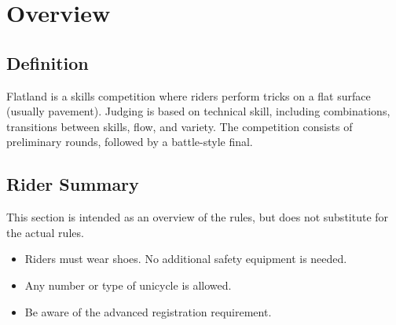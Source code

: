\chapter{Overview}

\section{Definition}

Flatland is a skills competition where riders perform 
tricks on a flat surface (usually pavement).
Judging is based on technical skill, including combinations, transitions between skills, flow, and variety.
The competition consists of preliminary rounds, followed by a battle-style final.

\section{Rider Summary}

This section is intended as an overview of the rules, but does not
substitute for the actual rules.
\begin{itemize}
\item Riders must wear shoes. No additional safety equipment is needed.
\item Any number or type of unicycle is allowed.
\item Be aware of the advanced registration requirement.
\end{itemize}